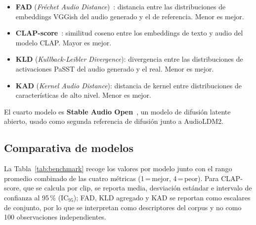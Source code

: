 \begin{itemize}
  \item \textbf{FAD} (\textit{Fréchet Audio Distance})~\cite{fad}: distancia entre
        las distribuciones de embeddings VGGish del audio generado y el de
        referencia. Menor es mejor.
  \item \textbf{CLAP-score}~\cite{clap}: similitud coseno entre los embeddings de
        texto y audio del modelo CLAP. Mayor es mejor.
  \item \textbf{KLD} (\textit{Kullback-Leibler Divergence}): divergencia entre las
        distribuciones de activaciones PaSST del audio generado y el real. Menor es
        mejor.
  \item \textbf{KAD} (\textit{Kernel Audio Distance}): distancia de kernel entre
        distribuciones de características de alto nivel. Menor es mejor.
\end{itemize}

El cuarto modelo es \textbf{Stable Audio Open}~\cite{stableaudio}, un modelo de
difusión latente abierto, usado como segunda referencia de difusión junto a
AudioLDM2.

\subsection{Comparativa de modelos}
\label{sec:benchmark:tabla}

La Tabla~\ref{tab:benchmark} recoge los valores por modelo junto con el rango
promedio combinado de las cuatro métricas (1\,=\,mejor, 4\,=\,peor). Para
CLAP-score, que se calcula por clip, se reporta media, desviación estándar e
intervalo de confianza al 95\,\% ($\text{IC}_{95}$); FAD, KLD agregado y KAD se
reportan como escalares de conjunto, por lo que se interpretan como descriptores
del corpus y no como 100 observaciones independientes.

